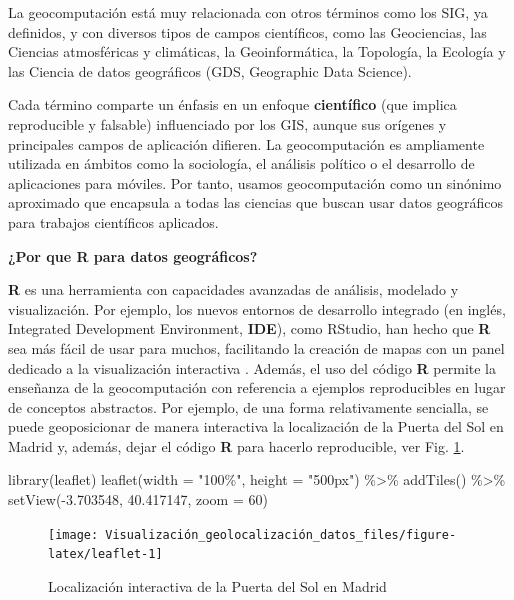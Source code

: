 \documentclass[
]{book}
\newenvironment{Shaded}{\begin{snugshade}}{\end{snugshade}}
\newcommand{\AttributeTok}[1]{\textcolor[rgb]{0.77,0.63,0.00}{#1}}
\newcommand{\DecValTok}[1]{\textcolor[rgb]{0.00,0.00,0.81}{#1}}
\newcommand{\FloatTok}[1]{\textcolor[rgb]{0.00,0.00,0.81}{#1}}
\newcommand{\FunctionTok}[1]{\textcolor[rgb]{0.00,0.00,0.00}{#1}}
\newcommand{\NormalTok}[1]{#1}
\newcommand{\SpecialCharTok}[1]{\textcolor[rgb]{0.00,0.00,0.00}{#1}}
\newcommand{\StringTok}[1]{\textcolor[rgb]{0.31,0.60,0.02}{#1}}
\theoremstyle{definition}
\theoremstyle{definition}
\theoremstyle{definition}
\theoremstyle{definition}
\theoremstyle{remark}
\begin{document}
La geocomputación está muy relacionada con otros términos como los SIG, ya
definidos, y con diversos tipos de campos científicos, como las Geociencias, las
Ciencias atmosféricas y climáticas, la Geoinformática, la Topología, la Ecología
y las Ciencia de datos geográficos (GDS, Geographic Data Science).

Cada término comparte un énfasis en un enfoque \textbf{científico} (que implica
reproducible y falsable) influenciado por los GIS, aunque sus orígenes y
principales campos de aplicación difieren. La geocomputación es ampliamente
utilizada en ámbitos como la sociología, el análisis político o el desarrollo de
aplicaciones para móviles. Por tanto, usamos geocomputación como un sinónimo
aproximado que encapsula a todas las ciencias que buscan usar datos geográficos
para trabajos científicos aplicados.

\textbf{¿Por que R para datos geográficos?}

\textbf{R} es una herramienta con capacidades avanzadas de análisis, modelado y
visualización. Por ejemplo, los nuevos entornos de desarrollo integrado (en
inglés, Integrated Development Environment, \textbf{IDE}), como RStudio, han hecho
que \textbf{R} sea más fácil de usar para muchos, facilitando la creación de mapas
con un panel dedicado a la visualización interactiva \citep{Lovelance_et_al_2019}.
Además, el uso del código \textbf{R} permite la enseñanza de la geocomputación con
referencia a ejemplos reproducibles en lugar de conceptos abstractos. Por
ejemplo, de una forma relativamente sencialla, se puede geoposicionar de manera
interactiva la localización de la Puerta del Sol en Madrid y, además, dejar el
código \textbf{R} para hacerlo reproducible, ver Fig. \ref{fig:leaflet}.

\begin{Shaded}
\begin{Highlighting}[]
\FunctionTok{library}\NormalTok{(leaflet)}
\FunctionTok{leaflet}\NormalTok{(}\AttributeTok{width =} \StringTok{"100\%"}\NormalTok{, }\AttributeTok{height =} \StringTok{"500px"}\NormalTok{) }\SpecialCharTok{\%\textgreater{}\%}
  \FunctionTok{addTiles}\NormalTok{() }\SpecialCharTok{\%\textgreater{}\%}
  \FunctionTok{setView}\NormalTok{(}\SpecialCharTok{{-}}\FloatTok{3.703548}\NormalTok{, }\FloatTok{40.417147}\NormalTok{, }\AttributeTok{zoom =} \DecValTok{60}\NormalTok{)}
\end{Highlighting}
\end{Shaded}

\begin{figure}

{\centering \texttt{[image: Visualización\_geolocalización\_datos\_files/figure-latex/leaflet-1]} 

}

\caption{Localización interactiva de la Puerta del Sol en Madrid}\label{fig:leaflet}
\end{figure}
\end{document}
